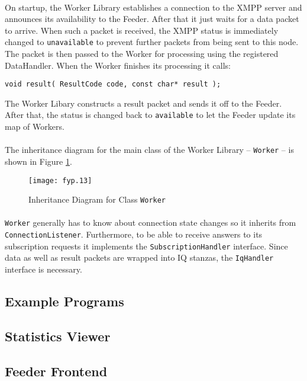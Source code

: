 \paragraph{}
On startup, the Worker Library establishes a connection to the XMPP server and announces its availability to the Feeder. After that it just waits for a data packet to arrive. When such a packet is received, the XMPP status is immediately changed to \texttt{unavailable} to prevent further packets from being sent to this node. The packet is then passed to the Worker for processing using the registered DataHandler. When the Worker finishes its processing it calls:
\begin{flushleft}
\texttt{void result( ResultCode code, const char* result );}
\end{flushleft}
The Worker Libary constructs a result packet and sends it off to the Feeder. After that, the status is changed back to \texttt{available} to let the Feeder update its map of Workers.

\paragraph{}
The inheritance diagram for the main class of the Worker Library -- \texttt{Worker} -- is shown in Figure \ref{fig:inhworker}.

\begin{figure}[H]
\begin{center}
\texttt{[image: fyp.13]}
\end{center}
\caption{Inheritance Diagram for Class \texttt{Worker}}
\label{fig:inhworker}
\end{figure}

\paragraph{}
\texttt{Worker} generally has to know about connection state changes so it inherits from \texttt{ConnectionListener}. Furthermore, to be able to receive answers to its subscription requests it implements the \texttt{SubscriptionHandler} interface. Since data as well as result packets are wrapped into IQ stanzas, the \texttt{IqHandler} interface is necessary.


\subsection{Example Programs}
\paragraph{}

\subsection{Statistics Viewer}
\paragraph{}

\subsection{Feeder Frontend}
\paragraph{}
